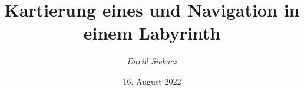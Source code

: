 \title{Kartierung eines und Navigation in einem Labyrinth}
\author{\textit{David Siekacz}}
\date{16. August 2022}

\titlehead{Hochschule Mannheim, Hector-Seminar}
\subject{Schriftliche Arbeit}
\publishers{Betreut durch Prof. Dr. Thomas Ihme}
\usepackage[defernumbers=true,backend=biber,
isbn=false,                  %
autocite=inline,             %
style=ieee,       %
hyperref=true,                  %
citestyle=numeric-comp,         %
natbib=true                     %
]{biblatex}  

